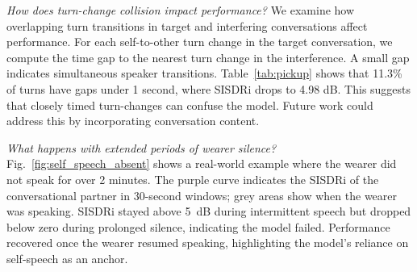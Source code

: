 {{\it How does turn-change collision impact performance?}  We examine how overlapping turn transitions in target and interfering conversations affect performance. For each self-to-other turn change in the target conversation, we compute the time gap to the nearest turn change in the interference. A small gap indicates simultaneous speaker transitions. Table~\ref{tab:pickup} shows that 11.3\% of turns have gaps under 1 second, where SISDRi drops to 4.98 dB. This suggests that closely timed turn-changes can confuse the model. Future work could address this by incorporating conversation content. 


{\it What happens with extended periods of wearer silence?} 
 Fig.~\ref{fig:self_speech_absent} shows a real-world example where the wearer did not speak for over 2 minutes. The purple curve indicates the SISDRi of the conversational partner in 30-second windows; grey areas show when the wearer was speaking. SISDRi stayed above 5~dB during intermittent speech but dropped below zero during prolonged silence, indicating the model failed. Performance recovered once the wearer resumed speaking, highlighting the model’s reliance on self-speech as an anchor.




}
